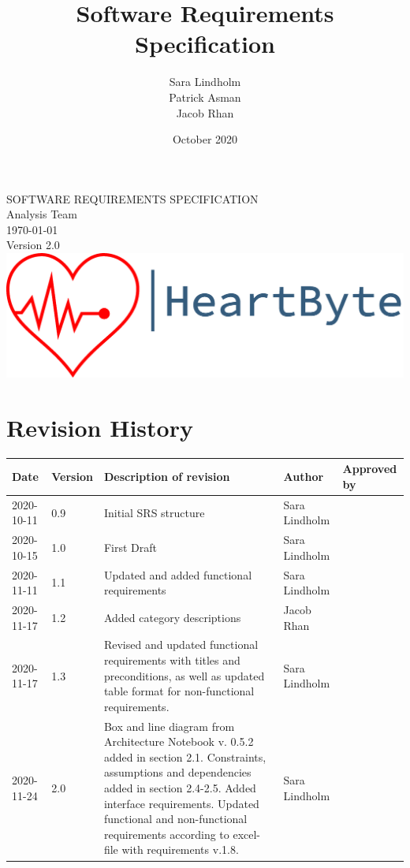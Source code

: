 \documentclass{scrreprt}
\title{Software Requirements Specification}
\author{Sara Lindholm \\ Patrick Asman \\ Jacob Rhan}
\date{October 2020}
\def\myversion{2.0}
\begin{document}
\begin{titlepage}
    \begin{center}
    \begin{bfseries}
        \Huge{SOFTWARE REQUIREMENTS SPECIFICATION}\\
        \vspace{1.5cm}
        \LARGE Analysis Team \\
        \vspace{1.5cm}
        \today\\
        \vspace{1.5cm}
        {Version \myversion}\\
        \vfill
        \includegraphics[width=\linewidth]{Pictures/logo.png} \\
    \end{bfseries}
    \end{center}
\end{titlepage}

\chapter*{Revision History}
\begin{center}
\begin{tabular}{|p{}|p{}|p{4.6cm}|p{2.5cm}|p{2.5cm}|}
 \hline
 \textbf{Date} & \textbf{Version} & \textbf{Description of revision} & \textbf{Author} & \textbf{Approved by} \\ 
 \hline
 2020-10-11 & 0.9 & Initial SRS structure & Sara Lindholm & \\
 \hline
 2020-10-15 & 1.0 & First Draft & Sara Lindholm & \\ 
 \hline
 2020-11-11 & 1.1 & Updated and added functional requirements & Sara Lindholm & \\
 \hline
 2020-11-17 & 1.2 & Added category descriptions & Jacob Rhan & \\
 \hline
 2020-11-17 & 1.3 & Revised and updated functional requirements with titles and preconditions, as well as updated table format for non-functional requirements. & Sara Lindholm & \\
 \hline 
 2020-11-24 & 2.0 & Box and line diagram from Architecture Notebook v. 0.5.2 added in section 2.1. Constraints, assumptions and dependencies added in section 2.4-2.5. Added interface requirements. Updated functional and non-functional requirements according to excel-file with requirements v.1.8. & Sara Lindholm & \\
 \hline
\end{tabular}
\end{center}
\end{document}
